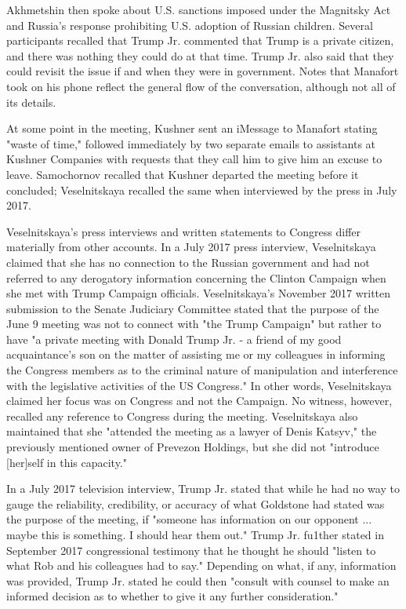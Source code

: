Akhmetshin then spoke about U.S. sanctions imposed under the Magnitsky Act and Russia's response prohibiting U.S. adoption of Russian children.%
Several participants recalled that Trump Jr. commented that Trump is a private citizen, and there was nothing they could do at that time.%
Trump Jr. also said that they could revisit the issue if and when they were in government.%
Notes that Manafort took on his phone reflect the general flow of the conversation, although not all of its details.%

At some point in the meeting, Kushner sent an iMessage to Manafort stating "waste of time," followed immediately by two separate emails to assistants at Kushner Companies with requests that they call him to give him an excuse to leave.%
Samochornov recalled that Kushner departed the meeting before it concluded; Veselnitskaya recalled the same when interviewed by the press in July 2017.%

Veselnitskaya's press interviews and written statements to Congress differ materially from other accounts.
In a July 2017 press interview, Veselnitskaya claimed that she has no connection to the Russian government and had not referred to any derogatory information concerning the Clinton Campaign when she met with Trump Campaign officials.%
Veselnitskaya's November 2017 written submission to the Senate Judiciary Committee stated that the purpose of the June 9 meeting was not to connect with "the Trump Campaign" but rather to have "a private meeting with Donald Trump Jr. - a friend of my good acquaintance's son on the matter of assisting me or my colleagues in informing the Congress members as to the criminal nature of manipulation and interference with the legislative activities of the US Congress."%
In other words, Veselnitskaya claimed her focus was on Congress and not the Campaign.
No witness, however, recalled any reference to Congress during the meeting.
Veselnitskaya also maintained that she "attended the meeting as a lawyer of Denis Katsyv," the previously mentioned owner of Prevezon Holdings, but she did not "introduce [her]self in this capacity."%

In a July 2017 television interview, Trump Jr. stated that while he had no way to gauge the reliability, credibility, or accuracy of what Goldstone had stated was the purpose of the meeting, if "someone has information on our opponent ... maybe this is something.
I should hear them out."%
Trump Jr. fu1ther stated in September 2017 congressional testimony that he thought he should "listen to what Rob and his colleagues had to say."%
Depending on what, if any, information was provided, Trump Jr. stated he could then "consult with counsel to make an informed decision as to whether to give it any further consideration."%

